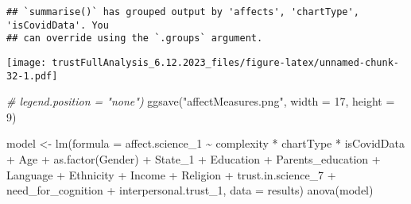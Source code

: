 \documentclass[
]{article}
\newenvironment{Shaded}{\begin{snugshade}}{\end{snugshade}}
\newcommand{\AttributeTok}[1]{\textcolor[rgb]{0.77,0.63,0.00}{#1}}
\newcommand{\CommentTok}[1]{\textcolor[rgb]{0.56,0.35,0.01}{\textit{#1}}}
\newcommand{\DecValTok}[1]{\textcolor[rgb]{0.00,0.00,0.81}{#1}}
\newcommand{\FunctionTok}[1]{\textcolor[rgb]{0.00,0.00,0.00}{#1}}
\newcommand{\NormalTok}[1]{#1}
\newcommand{\OtherTok}[1]{\textcolor[rgb]{0.56,0.35,0.01}{#1}}
\newcommand{\SpecialCharTok}[1]{\textcolor[rgb]{0.00,0.00,0.00}{#1}}
\newcommand{\StringTok}[1]{\textcolor[rgb]{0.31,0.60,0.02}{#1}}
\begin{document}
\begin{verbatim}
## `summarise()` has grouped output by 'affects', 'chartType', 'isCovidData'. You
## can override using the `.groups` argument.
\end{verbatim}

\texttt{[image: trustFullAnalysis\_6.12.2023\_files/figure-latex/unnamed-chunk-32-1.pdf]}

\begin{Shaded}
\begin{Highlighting}[]
        \CommentTok{\# legend.position = "none")}
\FunctionTok{ggsave}\NormalTok{(}\StringTok{"affectMeasures.png"}\NormalTok{, }\AttributeTok{width =} \DecValTok{17}\NormalTok{, }\AttributeTok{height =} \DecValTok{9}\NormalTok{)}
\end{Highlighting}
\end{Shaded}

\begin{Shaded}
\begin{Highlighting}[]
\NormalTok{model }\OtherTok{\textless{}{-}} \FunctionTok{lm}\NormalTok{(}\AttributeTok{formula =}\NormalTok{ affect.science\_1 }\SpecialCharTok{\textasciitilde{}}\NormalTok{ complexity }\SpecialCharTok{*}\NormalTok{ chartType }\SpecialCharTok{*}\NormalTok{ isCovidData }\SpecialCharTok{+}
\NormalTok{              Age }\SpecialCharTok{+} \FunctionTok{as.factor}\NormalTok{(Gender) }\SpecialCharTok{+}\NormalTok{ State\_1 }\SpecialCharTok{+}\NormalTok{ Education }\SpecialCharTok{+}\NormalTok{ Parents\_education }\SpecialCharTok{+}\NormalTok{ Language }\SpecialCharTok{+} 
\NormalTok{              Ethnicity }\SpecialCharTok{+}\NormalTok{ Income }\SpecialCharTok{+}\NormalTok{ Religion }\SpecialCharTok{+}\NormalTok{ trust.in.science\_7 }\SpecialCharTok{+} 
\NormalTok{              need\_for\_cognition }\SpecialCharTok{+}\NormalTok{ interpersonal.trust\_1,}
            \AttributeTok{data =}\NormalTok{ results)}
\FunctionTok{anova}\NormalTok{(model)}
\end{Highlighting}
\end{Shaded}
\end{document}
